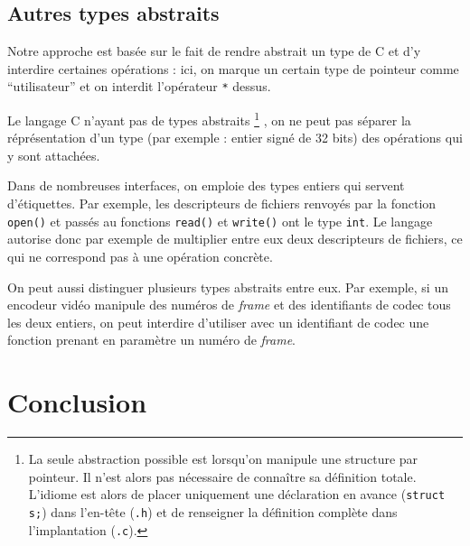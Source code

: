 \subsection{Autres types abstraits}

Notre approche est basée sur le fait de rendre abstrait un type de C et
d'y interdire certaines opérations : ici, on marque un certain type de pointeur
comme ``utilisateur'' et on interdit l'opérateur \texttt{*} dessus.

Le langage C n'ayant pas de types abstraits
\footnote{
  La seule abstraction possible est lorsqu'on manipule une structure par
  pointeur. Il n'est alors pas nécessaire de connaître sa définition totale.
  L'idiome est alors de placer uniquement une déclaration en avance
  (\texttt{struct s;}) dans l'en-tête (\texttt{.h}) et de renseigner
  la définition complète dans l'implantation (\texttt{.c}).
}
, on ne peut pas séparer la réprésentation d'un type (par exemple : entier signé
de 32 bits) des opérations qui y sont attachées.

Dans de nombreuses interfaces, on emploie des types entiers qui servent
d'étiquettes. Par exemple, les descripteurs de fichiers renvoyés par la fonction
\texttt{open()} et passés au fonctions \texttt{read()} et \texttt{write()} ont
le type \texttt{int}. Le langage autorise donc par exemple de multiplier entre
eux deux descripteurs de fichiers, ce qui ne correspond pas à une opération
concrète.

On peut aussi distinguer plusieurs types abstraits entre eux. Par exemple, si un
encodeur vidéo manipule des numéros de \emph{frame} et des identifiants de codec
tous les deux entiers, on peut interdire d'utiliser avec un identifiant de codec
une fonction prenant en paramètre un numéro de \emph{frame}.

\section{Conclusion}


\wip
